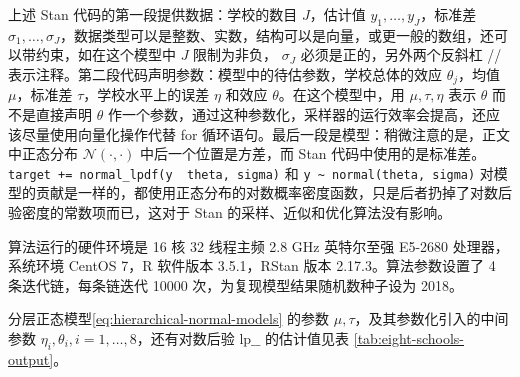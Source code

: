 \documentclass[12pt,a4paper,UTF8,twoside]{book}
\theoremstyle{definition}
\theoremstyle{definition}
\theoremstyle{definition}
\theoremstyle{remark}
\begin{document}
上述 Stan 代码的第一段提供数据：学校的数目 \(J\)，估计值
\(y_1,\ldots,y_{J}\)，标准差
\(\sigma_1,\ldots,\sigma_{J}\)，数据类型可以是整数、实数，结构可以是向量，或更一般的数组，还可以带约束，如在这个模型中
\(J\) 限制为非负， \(\sigma_{J}\) 必须是正的，另外两个反斜杠 //
表示注释。第二段代码声明参数：模型中的待估参数，学校总体的效应
\(\theta_j\)，均值 \(\mu\)，标准差 \(\tau\)，学校水平上的误差 \(\eta\)
和效应 \(\theta\)。在这个模型中，用 \(\mu,\tau,\eta\) 表示 \(\theta\)
而不是直接声明 \(\theta\)
作一个参数，通过这种参数化，采样器的运行效率会提高，还应该尽量使用向量化操作代替
for 循环语句。最后一段是模型：稍微注意的是，正文中正态分布
\(\mathcal{N}(\cdot,\cdot)\) 中后一个位置是方差，而 Stan
代码中使用的是标准差。\texttt{target\ +=\ normal\_lpdf(y\ \textbar{}\ theta,\ sigma)}
和 \texttt{y\ \textasciitilde{}\ normal(theta,\ sigma)}
对模型的贡献是一样的，都使用正态分布的对数概率密度函数，只是后者扔掉了对数后验密度的常数项而已，这对于
Stan 的采样、近似和优化算法没有影响。

算法运行的硬件环境是 16 核 32 线程主频 2.8 GHz 英特尔至强 E5-2680
处理器，系统环境 CentOS 7，R 软件版本 3.5.1，RStan 版本
2.17.3。算法参数设置了 4 条迭代链，每条链迭代 10000
次，为复现模型结果随机数种子设为 2018。

分层正态模型\eqref{eq:hierarchical-normal-models} 的参数
\(\mu,\tau\)，及其参数化引入的中间参数
\(\eta_i,\theta_i,i=1,\ldots,8\)，还有对数后验 \(\mathrm{lp}\_\_\)
的估计值见表 \ref{tab:eight-schools-output}。
\end{document}
